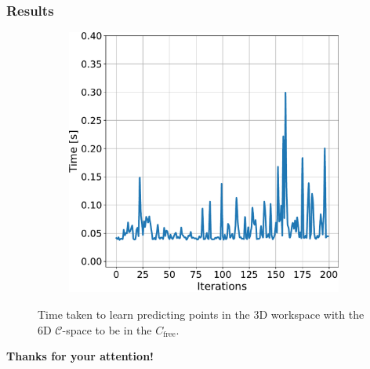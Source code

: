 \documentclass{beamer}
\begin{document}
\begin{frame}
	\frametitle{Results}	
	\begin{figure}[!ht]
		\centering   
		\begin{subfigure}[t]{0.49\textwidth}
		  \includegraphics[width=\textwidth]{figChap5/graph_6D_learning.pdf}   
		
		\end{subfigure} 
		\caption{Time taken to learn predicting points  
		in the 3D workspace with the 6D $\mathcal{C}$-space 
		to be in the \(C_{\text{free}}\).} 
	  \end{figure}
\end{frame}	

\begin{frame} 
	\vfill
    \centering
    \fontsize{24}{0}\selectfont
    \textbf{Thanks for your attention!}\\[1em] 
    \vfill
\end{frame}	




\end{document}
